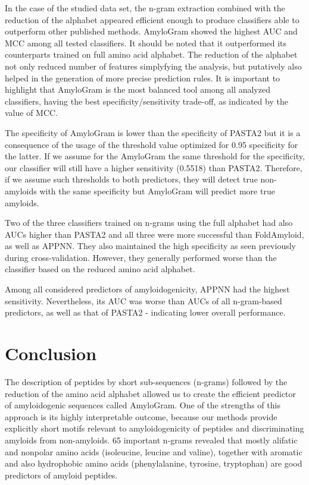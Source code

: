 \documentclass[fleqn,10pt,twoside]{gcb15submission}
\begin{document}
  In the case of the studied data set, the n-gram extraction combined with the 
reduction of the alphabet appeared efficient enough to produce classifiers able 
to outperform other published methods. AmyloGram showed the highest AUC and MCC 
among all tested classifiers. It should be noted that it outperformed its 
counterparts trained on full amino acid alphabet. The reduction of the 
alphabet not only reduced number of features simplyfying the analysis, but 
putatively also helped in the generation of more
precise prediction rules. It is important to highlight that AmyloGram 
is the most balanced tool among all analyzed classifiers, having the best 
specificity/sensitivity trade-off, as indicated by the value of MCC.

  The specificity of AmyloGram is lower than the specificity of PASTA2 but it is 
a consequence of the usage of the threshold value optimized for 0.95 specificity 
for the latter. If we assume for the AmyloGram the same threshold for the 
specificity, our classifier will still have a higher sensitivity (0.5518) than 
PASTA2. Therefore, if we assume such thresholds to both predictors, they will 
detect true non-amyloids with the same specificity but AmyloGram will predict 
more true amyloids. 

  Two of  the three classifiers trained on  n-grams using  the full alphabet 
had also AUCs higher than PASTA2 and all three were more successful than 
FoldAmyloid, as well as APPNN. They also maintained the high specificity as seen 
previously during cross-validation. However, they generally performed worse than 
the classifier based on the reduced amino acid alphabet.
  
  Among all considered predictors of amyloidogenicity, APPNN had the highest 
sensitivity. Nevertheless, its AUC was worse than AUCs of all n-gram-based 
predictors, as well as that of PASTA2  - indicating lower overall performance.


\section{Conclusion}

The description of peptides by short sub-sequences (n-grams) followed by the 
reduction of the amino acid alphabet allowed us to create the efficient 
predictor of amyloidogenic sequences called AmyloGram. One of the strengths of 
this approach is its highly interpretable outcome, because our methods provide 
explicitly short motifs relevant to amyloidogenicity of peptides and 
discriminating amyloids from  non-amyloids. 65 important n-grams revealed that 
mostly alifatic and nonpolar amino acids (isoleucine, leucine and valine), 
together with aromatic and also hydrophobic amino acids (phenylalanine, 
tyrosine, tryptophan)  are good predictors of amyloid peptides.
\end{document}
